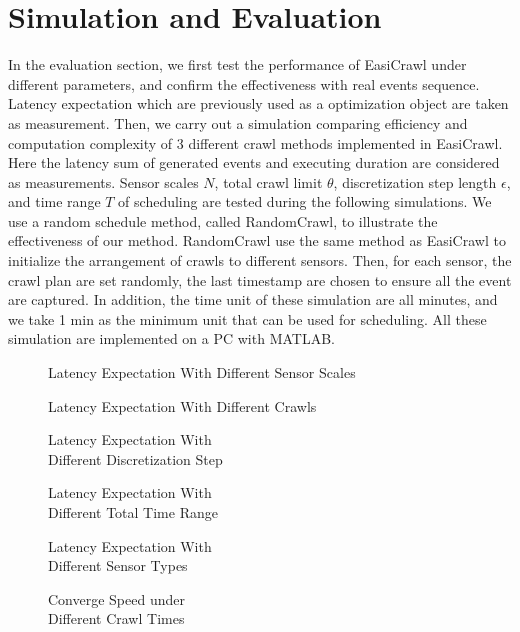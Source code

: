 \documentclass[conference]{IEEEtran}
\begin{document}
\section{Simulation and Evaluation} \label{simulation}

In the evaluation section, we first test the performance of EasiCrawl under different parameters, and confirm the effectiveness with real events sequence. Latency expectation which are previously used as a optimization object are taken as measurement.
Then, we carry out a simulation comparing efficiency and computation complexity of 3 different crawl methods implemented in EasiCrawl. Here the latency sum of generated events and executing duration are considered as measurements.
Sensor scales $N$, total crawl limit $\theta$, discretization step length $\epsilon$, and time range $T$ of scheduling are tested during the following simulations. We use a random schedule method, called RandomCrawl, to illustrate the effectiveness of our method. RandomCrawl use the same method as EasiCrawl to initialize the arrangement of crawls to different sensors. Then, for each sensor, the crawl plan are set randomly, the last timestamp are chosen to ensure all the event are captured. In addition, the time unit of these simulation are all minutes, and we take 1 min as the minimum unit that can be used for scheduling.
All these simulation are implemented on a PC with MATLAB.
\begin{figure*}
		
		\captionsetup{justification=centering}
		\caption{Latency Expectation With Different Sensor Scales}
		\label{fig:test1_sensorscale}
	\endminipage\hfill
		
		\captionsetup{justification=centering}
		\caption{Latency Expectation With Different Crawls}
		\label{fig:test2_totalcrawl}
	\endminipage\hfill
		
		\captionsetup{justification=centering}
		\caption{Latency Expectation With \\Different Discretization Step}
		\label{fig:test3_discretestep}
	\endminipage
	
		
		\captionsetup{justification=centering}
		\caption{Latency Expectation With \\Different Total Time Range}
		\label{fig:test4_timerange}
	\endminipage\hfill
		
		\captionsetup{justification=centering}
		\caption{Latency Expectation With \\Different Sensor Types}
		\label{fig:test5_sensortype}
	\endminipage\hfill
		
		\captionsetup{justification=centering}
		\caption{Converge Speed under \\Different Crawl Times}
		\label{fig:test6_convergespeed}
	\endminipage	
\end{figure*}
\end{document}
